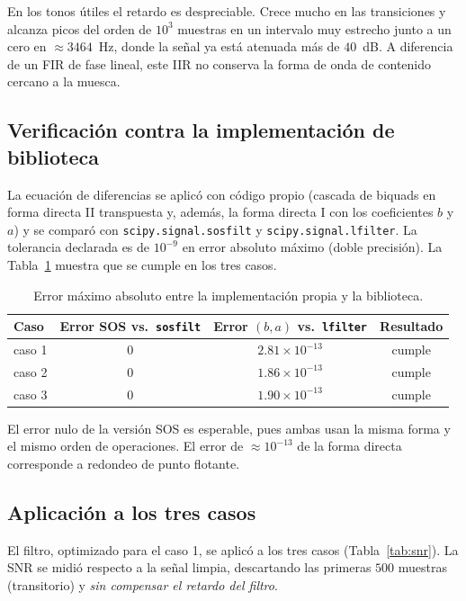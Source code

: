 En los tonos útiles el retardo es despreciable. Crece mucho en las transiciones y alcanza picos del orden de $10^3$ muestras en un intervalo muy estrecho junto a un cero en $\approx 3464$~Hz, donde la señal ya está atenuada más de $40$~dB. A diferencia de un FIR de fase lineal, este IIR no conserva la forma de onda de contenido cercano a la muesca.

\subsection{Verificación contra la implementación de biblioteca}

La ecuación de diferencias se aplicó con código propio (cascada de biquads en forma directa II transpuesta y, además, la forma directa I con los coeficientes $b$ y $a$) y se comparó con \texttt{scipy.signal.sosfilt} y \texttt{scipy.signal.lfilter}. La tolerancia declarada es de $10^{-9}$ en error absoluto máximo (doble precisión). La Tabla~\ref{tab:equiv} muestra que se cumple en los tres casos.

\begin{table}[h]
\centering
\begin{tabular}{|l|c|c|c|}
\hline
\textbf{Caso} & \textbf{Error SOS vs.\ \texttt{sosfilt}} & \textbf{Error $(b,a)$ vs.\ \texttt{lfilter}} & \textbf{Resultado} \\ \hline
caso 1 & $0$ & $2.81\times 10^{-13}$ & cumple \\ \hline
caso 2 & $0$ & $1.86\times 10^{-13}$ & cumple \\ \hline
caso 3 & $0$ & $1.90\times 10^{-13}$ & cumple \\ \hline
\end{tabular}
\caption{Error máximo absoluto entre la implementación propia y la biblioteca.}
\label{tab:equiv}
\end{table}

El error nulo de la versión SOS es esperable, pues ambas usan la misma forma y el mismo orden de operaciones. El error de $\approx 10^{-13}$ de la forma directa corresponde a redondeo de punto flotante.

\subsection{Aplicación a los tres casos}

El filtro, optimizado para el caso 1, se aplicó a los tres casos (Tabla~\ref{tab:snr}). La SNR se midió respecto a la señal limpia, descartando las primeras $500$ muestras (transitorio) y \emph{sin compensar el retardo del filtro}.

